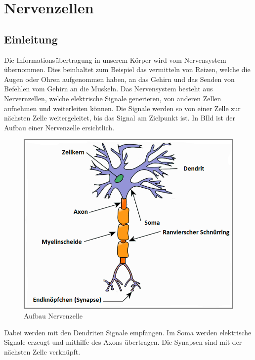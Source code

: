%
%
%
%
\chapter{Nervenzellen\label{chapter:nerven}}
\begin{refsection}
\section{Einleitung}
Die Informationsübertragung in unserem Körper wird vom Nervensystem übernommen.
Dies beinhaltet zum Beispiel das vermitteln von Reizen, welche die Augen oder Ohren aufgenommen haben, an das Gehirn und das Senden von Befehlen vom Gehirn an die Muskeln.
Das Nervensystem besteht aus Nervernzellen, welche elektrische Signale generieren, von anderen Zellen aufnehmen und weiterleiten können.
Die Signale werden so von einer Zelle zur nächsten Zelle weitergeleitet, bis das Signal am Zielpunkt ist.
In BIld ist der Aufbau einer Nervenzelle ersichtlich. 
\begin{figure}[h]
    \centering
    \includegraphics{papers/nerven/Bilder/NervenAufbau.png}
    \caption{Aufbau Nervenzelle}
    \label{fig:Aufbau Nervenzelle}
\end{figure}
Dabei werden mit den Dendriten Signale empfangen. 
Im Soma werden elektrische Signale erzeugt und mithilfe des Axons übertragen.
Die Synapsen sind mit der nächsten Zelle verknüpft.



\end{refsection}
